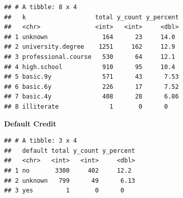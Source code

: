 \documentclass[
]{article}
\newenvironment{Shaded}{\begin{snugshade}}{\end{snugshade}}
\newcommand{\AttributeTok}[1]{\textcolor[rgb]{0.13,0.29,0.53}{#1}}
\newcommand{\ConstantTok}[1]{\textcolor[rgb]{0.56,0.35,0.01}{#1}}
\newcommand{\DecValTok}[1]{\textcolor[rgb]{0.00,0.00,0.81}{#1}}
\newcommand{\FunctionTok}[1]{\textcolor[rgb]{0.13,0.29,0.53}{\textbf{#1}}}
\newcommand{\NormalTok}[1]{#1}
\newcommand{\OtherTok}[1]{\textcolor[rgb]{0.56,0.35,0.01}{#1}}
\newcommand{\SpecialCharTok}[1]{\textcolor[rgb]{0.81,0.36,0.00}{\textbf{#1}}}
\newcommand{\StringTok}[1]{\textcolor[rgb]{0.31,0.60,0.02}{#1}}
\begin{document}
\begin{verbatim}
## # A tibble: 8 x 4
##   k                   total y_count y_percent
##   <chr>               <int>   <int>     <dbl>
## 1 unknown               164      23     14.0 
## 2 university.degree    1251     162     12.9 
## 3 professional.course   530      64     12.1 
## 4 high.school           910      95     10.4 
## 5 basic.9y              571      43      7.53
## 6 basic.6y              226      17      7.52
## 7 basic.4y              408      28      6.86
## 8 illiterate              1       0      0
\end{verbatim}

\textbf{Default Credit}

\begin{Shaded}
\end{Shaded}

\begin{verbatim}
## # A tibble: 3 x 4
##   default total y_count y_percent
##   <chr>   <int>   <int>     <dbl>
## 1 no       3300     402     12.2 
## 2 unknown   799      49      6.13
## 3 yes         1       0      0
\end{verbatim}
\end{document}
